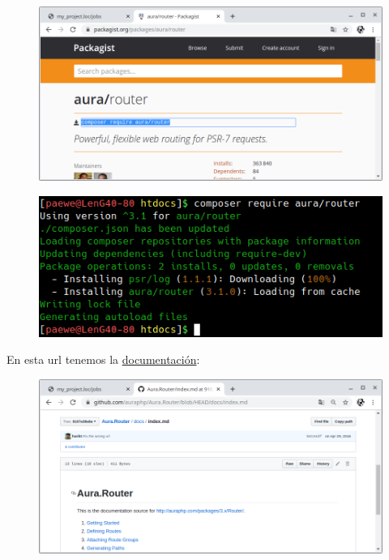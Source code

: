 \documentclass{article}
\begin{document}
\begin{figure}[h!]
  \centering
  \includegraphics[scale=0.5]{./Pictures/117_aura_router.png}
\end{figure}

\begin{figure}[h!]
  \centering
  \includegraphics[scale=0.75]{./Pictures/118_aura_composer.png}
\end{figure}

En esta url tenemos la
\href{https://github.com/auraphp/Aura.Router/blob/HEAD/docs/index.md}{documentación}:\\

\newpage

\begin{figure}[h!]
  \centering
  \includegraphics[scale=0.5]{./Pictures/119_aura_documentation.png}
\end{figure}
\end{document}

